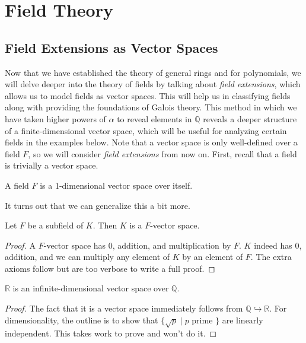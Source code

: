 \section{Field Theory}

\subsection{Field Extensions as Vector Spaces}

  Now that we have established the theory of general rings and for polynomials, we will delve deeper into the theory of fields by talking about \textit{field extensions}, which allows us to model fields as vector spaces. This will help us in classifying fields along with providing the foundations of Galois theory. This method in which we have taken higher powers of $\alpha$ to reveal elements in $\mathbb{Q}$ reveals a deeper structure of a finite-dimensional vector space, which will be useful for analyzing certain fields in the examples below. Note that a vector space is only well-defined over a field $F$, so we will consider \textit{field extensions} from now on. First, recall that a field is trivially a vector space. 

  \begin{lemma}
    A field $F$ is a 1-dimensional vector space over itself. 
  \end{lemma} 

  It turns out that we can generalize this a bit more. 

  \begin{theorem}
    \label{thm:fields_vector_space}
    Let $F$ be a subfield of $K$. Then $K$ is a $F$-vector space. 
  \end{theorem}
  \begin{proof}
    A $F$-vector space has $0$, addition, and multiplication by $F$. $K$ indeed has $0$, addition, and we can multiply any element of $K$ by an element of $F$. The extra axioms follow but are too verbose to write a full proof. 
  \end{proof}

  \begin{corollary} 
    $\mathbb{R}$ is an infinite-dimensional vector space over $\mathbb{Q}$. 
  \end{corollary}
  \begin{proof}
    The fact that it is a vector space immediately follows from $\mathbb{Q} \hookrightarrow \mathbb{R}$. For dimensionality, the outline is to show that $\{\sqrt{p} \mid p \text{ prime }\}$ are linearly independent. This takes work to prove and won't do it. 
  \end{proof}

